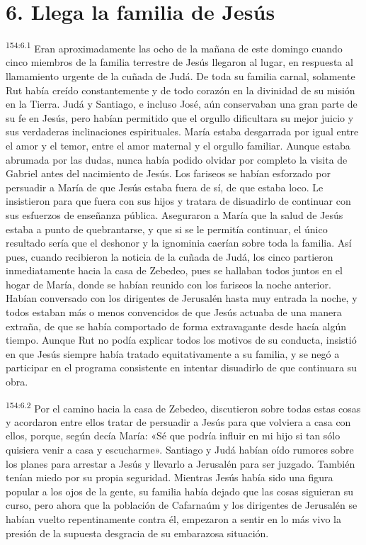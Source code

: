 \section*{6. Llega la familia de Jesús}
\par 
\textsuperscript{154:6.1} Eran aproximadamente las ocho de la mañana de este domingo cuando cinco miembros de la familia terrestre de Jesús llegaron al lugar, en respuesta al llamamiento urgente de la cuñada de Judá. De toda su familia carnal, solamente Rut había creído constantemente y de todo corazón en la divinidad de su misión en la Tierra. Judá y Santiago, e incluso José, aún conservaban una gran parte de su fe en Jesús, pero habían permitido que el orgullo dificultara su mejor juicio y sus verdaderas inclinaciones espirituales. María estaba desgarrada por igual entre el amor y el temor, entre el amor maternal y el orgullo familiar. Aunque estaba abrumada por las dudas, nunca había podido olvidar por completo la visita de Gabriel antes del nacimiento de Jesús. Los fariseos se habían esforzado por persuadir a María de que Jesús estaba fuera de sí, de que estaba loco. Le insistieron para que fuera con sus hijos y tratara de disuadirlo de continuar con sus esfuerzos de enseñanza pública. Aseguraron a María que la salud de Jesús estaba a punto de quebrantarse, y que si se le permitía continuar, el único resultado sería que el deshonor y la ignominia caerían sobre toda la familia. Así pues, cuando recibieron la noticia de la cuñada de Judá, los cinco partieron inmediatamente hacia la casa de Zebedeo, pues se hallaban todos juntos en el hogar de María, donde se habían reunido con los fariseos la noche anterior. Habían conversado con los dirigentes de Jerusalén hasta muy entrada la noche, y todos estaban más o menos convencidos de que Jesús actuaba de una manera extraña, de que se había comportado de forma extravagante desde hacía algún tiempo. Aunque Rut no podía explicar todos los motivos de su conducta, insistió en que Jesús siempre había tratado equitativamente a su familia, y se negó a participar en el programa consistente en intentar disuadirlo de que continuara su obra.

\par 
\textsuperscript{154:6.2} Por el camino hacia la casa de Zebedeo, discutieron sobre todas estas cosas y acordaron entre ellos tratar de persuadir a Jesús para que volviera a casa con ellos, porque, según decía María: «Sé que podría influir en mi hijo si tan sólo quisiera venir a casa y escucharme». Santiago y Judá habían oído rumores sobre los planes para arrestar a Jesús y llevarlo a Jerusalén para ser juzgado. También tenían miedo por su propia seguridad. Mientras Jesús había sido una figura popular a los ojos de la gente, su familia había dejado que las cosas siguieran su curso, pero ahora que la población de Cafarnaúm y los dirigentes de Jerusalén se habían vuelto repentinamente contra él, empezaron a sentir en lo más vivo la presión de la supuesta desgracia de su embarazosa situación.

